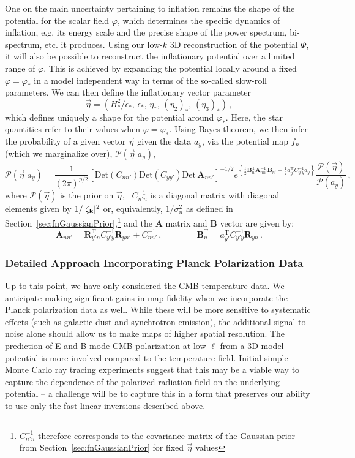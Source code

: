 \documentclass[psfig,11pt]{article}
\def\be{\begin{equation}}
\def\ee{\end{equation}}
\begin{document}
One on the main uncertainty pertaining to inflation remains the shape of the potential for the scalar field $\varphi$, which determines the specific dynamics of inflation, e.g. its energy scale and the precise shape of the power spectrum, bi-spectrum, etc. it produces. Using our low-$k$ 3D reconstruction of the potential $\Phi$, it will also be possible to reconstruct the inflationary potential over a limited range of $\varphi$. This is achieved by expanding the potential locally around a fixed $\varphi=\varphi_*$ in a model independent way in terms of the so-called slow-roll parameters. We can then define the inflationary vector parameter
\be
	\vec{\eta}=(H^2_*/\epsilon_*,\, \epsilon_*, \,\eta_*, \, (\eta_2)_*, \,(\eta_3)_*)\, ,
\ee
which defines uniquely a shape for the potential around $\varphi_*$. Here, the star quantities refer to their values when $\varphi=\varphi_*$. Using Bayes theorem, we then infer the probability of a given vector $\vec{\eta}$ given the data $a_y$, via the potential map $f_n$ (which we marginalize over), $\mathcal{P}(\vec{\eta}| a_{y})$,
\be
\mathcal{P}(\vec{\eta}| a_{y})=\frac{1}{(2\pi)^{p/2}} \left[\mathrm{Det}(C_{nn'})\mathrm{Det}(C_{yy'})\mathrm{Det}\,\mathbf{A}_{nn'}\right]^{-1/2}e^{\left\{\frac{1}{2}\mathbf{B}_{n}^{\mathrm{T}}\mathbf{A}_{nn'}^{-1}\mathbf{B}_{n'}-\frac{1}{2}a^{\mathrm{T}}_{y'}C_{y'y}^{-1}a_{y} \right\}}\frac{\mathcal{P}(\vec{\eta})}{\mathcal{P}(a_{y})}\, ,
\ee
where $\mathcal{P}(\vec{\eta})$ is the prior on $\vec{\eta}$, ~$C_{n'n}^{-1}$ is a diagonal matrix with diagonal elements given by $1/|\zeta_{{\bf k}}|^2$ or, equivalently, $1/{\sigma_{ n}^2}$ as defined in Section~\ref{sec:fnGaussianPrior},\footnote{$C_{n'n}^{-1}$ therefore corresponds to the covariance matrix of the Gaussian prior from Section~\ref{sec:fnGaussianPrior} for fixed $\vec{\eta}$ values} and the $\mathbf{A}$ matrix and $\mathbf{B}$ vector are given by:
\be
	\mathbf{A}_{nn'}=\mathbf{R}_{y'n}^{\mathrm{T}}C^{-1}_{y'y} \mathbf{R}_{yn'}+C_{nn'}^{-1}\, ,\qquad \qquad
	 \mathbf{B}_{n}^{\mathrm{T}}=a_{y'}^{\mathrm{T}}C_{y'y}^{-1}\mathbf{R}_{yn}\, .
\ee


\subsubsection{Detailed Approach Incorporating Planck Polarization Data}

Up to this point, we have only considered the CMB temperature data. We anticipate making significant gains in map fidelity when we incorporate the Planck polarization data as well. While these will be more sensitive to systematic effects (such as galactic dust and synchrotron emission), the additional signal to noise alone should allow us to make maps of higher spatial resolution. The prediction of E and B mode CMB polarization at low $\ell$ from a 3D model potential is more involved compared to the temperature field. Initial simple Monte Carlo ray tracing experiments suggest that this may be a viable way to capture the dependence of the polarized radiation field on the underlying potential -- a challenge will be to capture this in a form that preserves our ability to use only the fast linear inversions described above.
\end{document}
